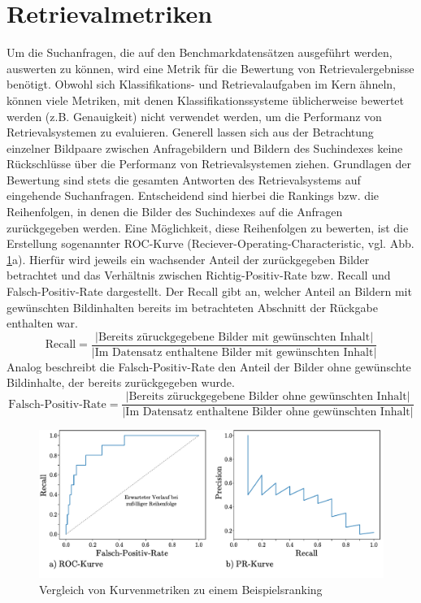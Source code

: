 \section{Retrievalmetriken}
Um die Suchanfragen, die auf den Benchmarkdatensätzen ausgeführt werden, auswerten zu können, wird eine Metrik für die Bewertung von Retrievalergebnisse benötigt.  
Obwohl sich Klassifikations- und Retrievalaufgaben im Kern ähneln, können viele Metriken, mit denen Klassifikationssysteme üblicherweise bewertet werden (z.B. Genauigkeit) nicht verwendet werden, um die Performanz von Retrievalsystemen zu evaluieren. Generell lassen sich aus der Betrachtung einzelner Bildpaare zwischen Anfragebildern und Bildern des Suchindexes keine Rückschlüsse über die Performanz von Retrievalsystemen ziehen. Grundlagen der Bewertung sind stets die gesamten Antworten des Retrievalsystems auf eingehende Suchanfragen. Entscheidend sind hierbei die Rankings bzw. die Reihenfolgen, in denen die Bilder des Suchindexes auf die Anfragen zurückgegeben werden. Eine Möglichkeit, diese Reihenfolgen zu bewerten, ist die Erstellung sogenannter ROC-Kurve (Reciever-Operating-Characteristic, vgl. Abb. \ref{metric_curve}a). Hierfür wird jeweils ein wachsender Anteil der zurückgegeben Bilder betrachtet und das Verhältnis zwischen Richtig-Positiv-Rate bzw. Recall und Falsch-Positiv-Rate dargestellt. Der Recall gibt an, welcher Anteil an Bildern mit gewünschten Bildinhalten bereits im betrachteten Abschnitt der Rückgabe enthalten war.
\begin{equation}
\text{Recall} = \frac{|\text{Bereits züruckgegebene Bilder mit gewünschten Inhalt}|}{|\text{Im Datensatz enthaltene Bilder mit gewünschten Inhalt}|}
\end{equation}
Analog beschreibt die Falsch-Positiv-Rate den Anteil der Bilder ohne gewünschte Bildinhalte, der bereits zurückgegeben wurde.
\begin{equation}
\text{Falsch-Positiv-Rate} = \frac{|\text{Bereits züruckgegebene Bilder ohne gewünschten Inhalt}|}{|\text{Im Datensatz enthaltene Bilder ohne gewünschten Inhalt}|}
\end{equation}
\begin{figure}[h]
\includegraphics[scale=0.76]{metric_curves.pdf}
\caption{Vergleich von Kurvenmetriken zu einem Beispielsranking}
\label{metric_curve}
\end{figure}
